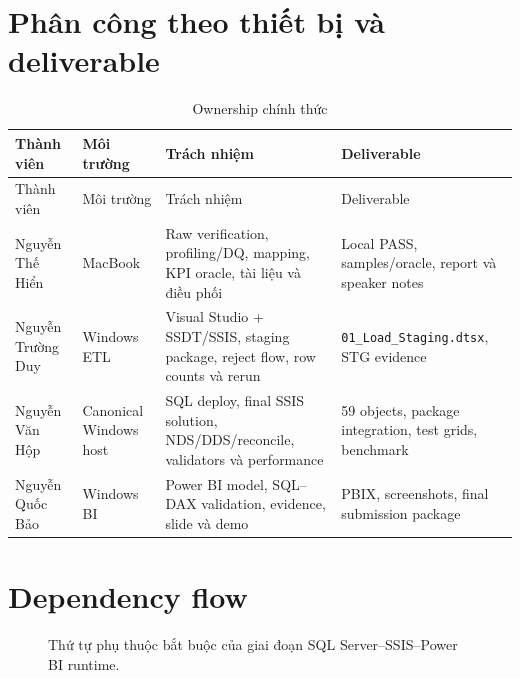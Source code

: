 \documentclass[11pt,a4paper]{article}
\begin{document}
\section{Phân công theo thiết bị và deliverable}
\begin{longtable}{p{3.1cm}p{3.3cm}p{5.0cm}p{3.0cm}}
\caption{Ownership chính thức}\label{tab:ownership}\\
\toprule
Thành viên & Môi trường & Trách nhiệm & Deliverable \\
\midrule
\endfirsthead
\toprule Thành viên & Môi trường & Trách nhiệm & Deliverable \\
\midrule
\endhead
Nguyễn Thế Hiển & MacBook & Raw verification, profiling/DQ, mapping, KPI oracle, tài liệu và điều phối & Local PASS, samples/oracle, report và speaker notes \\
Nguyễn Trường Duy & Windows ETL & Visual Studio + SSDT/SSIS, staging package, reject flow, row counts và rerun & \texttt{01\_Load\_Staging.dtsx}, STG evidence \\
Nguyễn Văn Hộp & Canonical Windows host & SQL deploy, final SSIS solution, NDS/DDS/reconcile, validators và performance & 59 objects, package integration, test grids, benchmark \\
Nguyễn Quốc Bảo & Windows BI & Power BI model, SQL--DAX validation, evidence, slide và demo & PBIX, screenshots, final submission package \\
\bottomrule
\end{longtable}

\section{Dependency flow}
\begin{figure}[h]
\centering
{}
\caption{Thứ tự phụ thuộc bắt buộc của giai đoạn SQL Server--SSIS--Power BI runtime.}
\end{figure}
\end{document}
